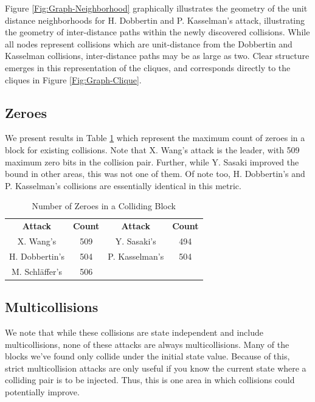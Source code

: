 \documentclass[conference]{IEEEtran}
\begin{document}
Figure \ref{Fig:Graph-Neighborhood} graphically illustrates the
geometry of the unit distance neighborhoods for H. Dobbertin and
P. Kasselman's attack, illustrating the geometry of inter-distance
paths within the newly discovered collisions.  While all nodes
represent collisions which are unit-distance from the Dobbertin and
Kasselman collisions, inter-distance paths may be as large as two.
Clear structure emerges in this representation of the cliques, and
corresponds directly to the cliques in Figure \ref{Fig:Graph-Clique}.

\subsection{Zeroes}

We present results in Table \ref{table:zeroes} which represent the maximum count of zeroes in a block
for existing collisions. Note that X. Wang's attack is the leader, with 509
maximum zero bits in the collision pair. Further, while Y. Sasaki improved
the bound in other areas, this was not one of them. Of note too,
H. Dobbertin's and P. Kasselman's collisions are essentially identical in
this metric.

\begin{table}
    \caption{Number of Zeroes in a Colliding Block}
    \label{table:zeroes}
    \begin{tabular}{c c c c}
        \textbf{Attack} & \textbf{Count} & \textbf{Attack} & \textbf{Count} \\
        X. Wang's & 509 & Y. Sasaki's & 494 \\
        H. Dobbertin's & 504 & P. Kasselman's & 504 \\
        M. Schl{\"a}ffer's & 506 & & \\
    \end{tabular}
\end{table}

\subsection{Multicollisions}

We note that while these collisions are state independent and include
multicollisions, none of these attacks are always multicollisions. Many of the
blocks we've found only collide under the initial state value. Because of this,
strict multicollision attacks are only useful if you know the current state where a
colliding pair is to be injected. Thus, this is one area in which collisions
could potentially improve.
\end{document}
